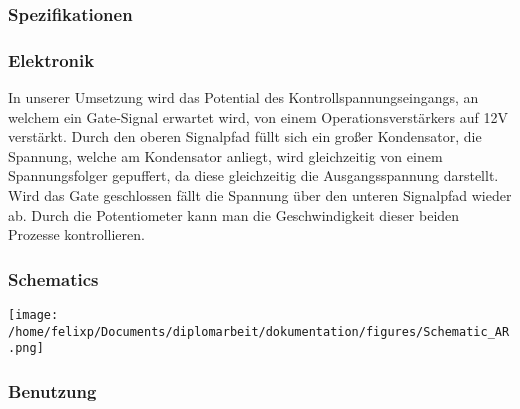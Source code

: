 \subsubsection{Spezifikationen}
\label{sec:org46e1855}
\subsubsection{Elektronik}
\label{sec:org68b4e69}
In unserer Umsetzung wird das Potential des Kontrollspannungseingangs, an welchem ein Gate-Signal erwartet wird, von einem Operationsverstärkers auf 12V verstärkt. Durch den oberen Signalpfad füllt sich ein großer Kondensator, die Spannung, welche am Kondensator anliegt, wird gleichzeitig von einem Spannungsfolger gepuffert, da diese gleichzeitig die Ausgangsspannung darstellt. Wird das Gate geschlossen fällt die Spannung über den unteren Signalpfad wieder ab. Durch die Potentiometer kann man die Geschwindigkeit dieser beiden Prozesse kontrollieren.
\subsubsection{Schematics}
\label{sec:org71301b7}
\begin{center}
\texttt{[image: /home/felixp/Documents/diplomarbeit/dokumentation/figures/Schematic\_AR.png]}
\end{center}
\subsubsection{Benutzung}
\label{sec:org9a8b887}
